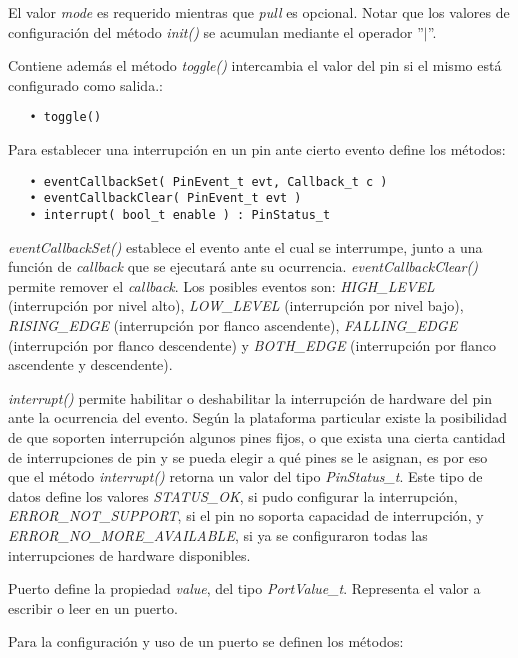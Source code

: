 El valor \emph{mode} es requerido mientras que \emph{pull} es opcional. Notar que los valores de configuración del método \emph{init()} se acumulan mediante el operador ''$|$''.

Contiene además el método \emph{toggle()} intercambia el valor del pin si el mismo está configurado como salida.:

\begin{verbatim}
   • toggle()
\end{verbatim}

Para establecer una interrupción en un pin ante cierto evento define los métodos: 

\begin{verbatim}
   • eventCallbackSet( PinEvent_t evt, Callback_t c )
   • eventCallbackClear( PinEvent_t evt )
   • interrupt( bool_t enable ) : PinStatus_t
 \end{verbatim} 

\emph{eventCallbackSet()} establece el evento ante el cual se interrumpe, junto a una función de \emph{callback} que se ejecutará ante su ocurrencia. \emph{eventCallbackClear()} permite remover el \emph{callback}. Los posibles eventos son: \emph{HIGH\_LEVEL} (interrupción por nivel alto), \emph{LOW\_LEVEL} (interrupción por nivel bajo), \emph{RISING\_EDGE} (interrupción por flanco ascendente), \emph{FALLING\_EDGE} (interrupción por flanco descendente) y \emph{BOTH\_EDGE} (interrupción por flanco ascendente y descendente). 

\emph{interrupt()} permite habilitar o deshabilitar la interrupción de hardware del pin ante la ocurrencia del evento. Según la plataforma particular existe la posibilidad de que soporten interrupción algunos pines fijos, o que exista una cierta cantidad de interrupciones de pin y se pueda elegir a qué pines se le asignan, es por eso que el método \emph{interrupt()} retorna un valor del tipo \emph{PinStatus\_t}. Este tipo de datos define los valores \emph{STATUS\_OK}, si pudo configurar la interrupción, \emph{ERROR\_NOT\_SUPPORT}, si el pin no soporta capacidad de interrupción, y \emph{ERROR\_NO\_MORE\_AVAILABLE}, si ya se configuraron todas las interrupciones de hardware disponibles. 


Puerto define la propiedad \emph{value}, del tipo \emph{PortValue\_t}. Representa el valor a escribir o leer en un puerto.

Para la configuración y uso de un puerto se definen los métodos:

